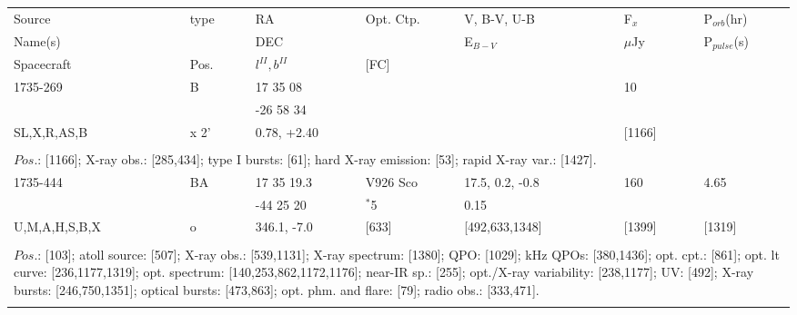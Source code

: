 \documentclass{aa}
\begin{document}
\begin{tabular}{p{2.5cm}p{1cm}p{1.8cm}p{2.3cm}p{3.3cm}p{2.0cm}p{2.2cm}}
\noalign{\smallskip}
\multicolumn{7}{p{17.5cm}}{Table 1.  (continued) }\\        
\hline
\noalign{\smallskip}
Source         & type  & RA                       &  Opt. Ctp. & V, B-V, U-B  & F$_{x}$          & P$_{orb}$(hr)    \\
Name(s)       &            & DEC                    &                     & E$_{B-V}$   & $\mu$Jy        & P$_{pulse}$(s) \\
Spacecraft & Pos.  & $l^{II}, b^{II}$      &  [FC]           &                        &                         &                             \\
\noalign{\smallskip} 
\hline

\noalign{\smallskip}
1735-269        & B             & 17 35 08              &                       &                         & 10             &              \\
                         &                 & -26 58 34             &                       &                         &                   &                 \\
SL,X,R,AS,B & x 2'          & 0.78, +2.40          &                       &                         & [1166]      &            \\
\\
\multicolumn{7}{p{17.5cm}}{
$Pos$.: [1166]; X-ray obs.: [285,434]; type I bursts: [61]; hard X-ray emission: [53]; rapid X-ray var.: [1427].}\\
\noalign{\smallskip}
\hline

\noalign{\smallskip}
1735-444                & BA            & 17 35 19.3          & V926 Sco      & 17.5, 0.2, -0.8           & 160        & 4.65       \\
                                 &                   & -44 25 20            & $^*$5              & 0.15                           &                &                \\
U,M,A,H,S,B,X      & o               & 346.1, -7.0           & [633]               & [492,633,1348]       & [1399]    & [1319]   \\
\\
\multicolumn{7}{p{17.5cm}}{
$Pos$.: [103]; atoll source: [507]; X-ray obs.: [539,1131]; X-ray spectrum: [1380]; QPO: [1029]; kHz QPOs: [380,1436]; 
opt. cpt.: [861]; opt. lt curve: [236,1177,1319]; opt. spectrum: [140,253,862,1172,1176]; near-IR sp.: [255]; opt./X-ray 
variability: [238,1177]; UV: [492]; X-ray bursts: [246,750,1351]; optical bursts: [473,863]; opt. phm. and flare: [79]; 
radio obs.: [333,471].}\\
\noalign{\smallskip}
\hline


\end{tabular}
\end{document}
